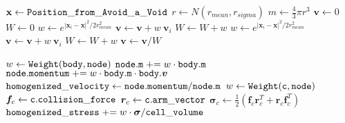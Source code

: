 \begin{algorithm}
\caption{${\tt Create \_ Discrete \_ Grain}$}
\begin{algorithmic}[1]
\State $\mathbf{x} \gets {\tt Position \_ from \_ Avoid \_ a \_ Void}$
\State $r \gets N\left( r_{mean}, r_{sigma} \right)$ 
\State $m \gets \frac{4}{3} \pi r ^ 3$
\State $\mathbf{v} \gets 0$
\State $W \gets 0$
 
    \State $w \gets e^{ \left| \mathbf{x}_i - \mathbf{x} \right|^2 / 2 r_{mean}^2}$
    \State $\mathbf{v} \gets \mathbf{v} + w \ \mathbf{v}_i$
    \State $W \gets W + w$
  \EndIf
\EndFor
{} 
    \State $w \gets e^{ \left| \mathbf{x}_i - \mathbf{x} \right|^2 / 2 r_{mean}^2}$
    \State $\mathbf{v} \gets \mathbf{v} + w \ \mathbf{v}_i$
    \State $W \gets W + w$
  \EndIf
\EndFor
\State $\mathbf{v} \gets \mathbf{v} / W$
\end{algorithmic} \label{alg:create_discrete_grain}
\end{algorithm}

\begin{algorithm}
\caption{${\tt Homogenize \_ Velocity \_ and \_ Stress}$}
\begin{algorithmic}[1]
    \State $w \leftarrow {\tt Weight(body, node)}$
    \State ${\tt node.m } \mathrel{{+}{=}} w \cdot {\tt body.m }$
    \State ${\tt node.momentum} \mathrel{{+}{=}} w \cdot {\tt body.m } \cdot {\tt body.}\bm{v}$
  \EndFor    
\EndFor
{}
    \State ${\tt homogenized \_ velocity} \leftarrow {\tt node.momentum} /  {\tt node.m}$
  \EndIf
\EndFor
{}
    \State $w \leftarrow {\tt Weight(c, node)}$
    \State $\boldsymbol{f}_c \leftarrow {\tt c}.{\tt collision \_ force}$ 
    \State $\boldsymbol{r}_c \leftarrow {\tt c}.{\tt arm \_ vector}$
    \State $\bm{\sigma}_c \leftarrow \frac{1}{2} \left( \boldsymbol{f}_c  \boldsymbol{r}_c^T + \boldsymbol{r}_c \boldsymbol{f}_c^T \right)$
    \State ${\tt homogenized \_ stress } \mathrel{{+}{=}} w \cdot \bm{\sigma} / {\tt cell \_ volume}$
  \EndFor
\EndFor
\end{algorithmic} \label{alg:homogenize_stress}
\end{algorithm}

